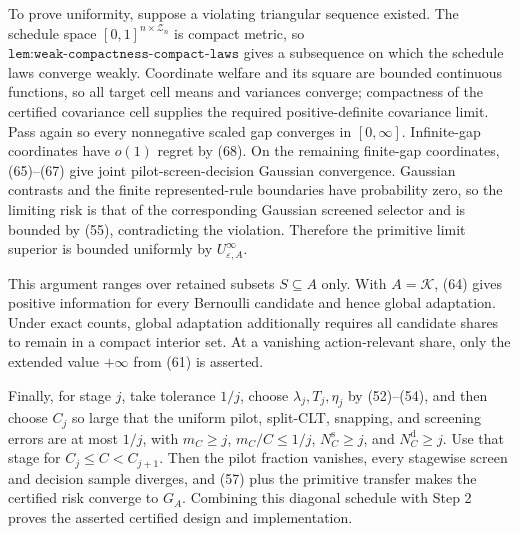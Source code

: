 To prove uniformity, suppose a violating triangular sequence existed.  The schedule space \([0,1]^{n\times\mathcal Z_n}\) is compact metric, so \(\texttt{lem:weak-compactness-compact-laws}\) gives a subsequence on which the schedule laws converge weakly.  Coordinate welfare and its square are bounded continuous functions, so all target cell means and variances converge; compactness of the certified covariance cell supplies the required positive-definite covariance limit.  Pass again so every nonnegative scaled gap converges in \([0,\infty]\).  Infinite-gap coordinates have \(o(1)\) regret by (68).  On the remaining finite-gap coordinates, (65)--(67) give joint pilot-screen-decision Gaussian convergence.  Gaussian contrasts and the finite represented-rule boundaries have probability zero, so the limiting risk is that of the corresponding Gaussian screened selector and is bounded by (55), contradicting the violation.  Therefore the primitive limit superior is bounded uniformly by \(U^{\infty}_{\varepsilon,A}\).

This argument ranges over retained subsets \(S\subseteq A\) only.  With \(A=\mathcal K\), (64) gives positive information for every Bernoulli candidate and hence global adaptation.  Under exact counts, global adaptation additionally requires all candidate shares to remain in a compact interior set.  At a vanishing action-relevant share, only the extended value \(+\infty\) from (61) is asserted.

Finally, for stage \(j\), take tolerance \(1/j\), choose \(\lambda_j,T_j,\eta_j\) by (52)--(54), and then choose \(C_j\) so large that the uniform pilot, split-CLT, snapping, and screening errors are at most \(1/j\), with \(m_C\geq j\), \(m_C/C\leq1/j\), \(N_C^{\mathrm s}\geq j\), and \(N_C^{\mathrm d}\geq j\).  Use that stage for \(C_j\leq C<C_{j+1}\).  Then the pilot fraction vanishes, every stagewise screen and decision sample diverges, and (57) plus the primitive transfer makes the certified risk converge to \(G_A\).  Combining this diagonal schedule with Step 2 proves the asserted certified design and implementation.